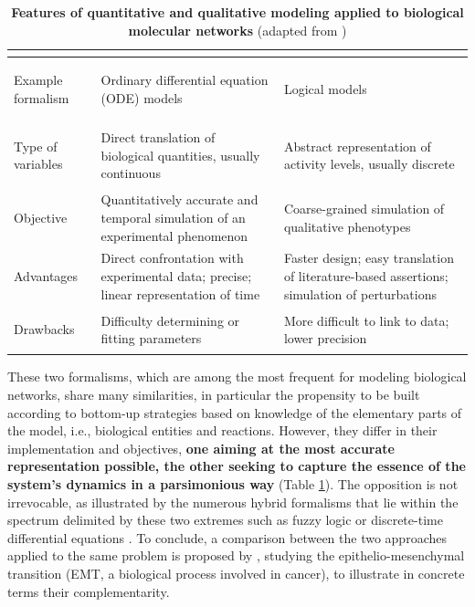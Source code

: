 \documentclass[a4paper,12pt,twoside,onecolumn,openright,final,oldfontcommands]{memoir}
\begin{document}
\begin{table}

\caption{\label{tab:odelogic}\textbf{Features of quantitative and qualitative
modeling applied to biological molecular networks} (adapted from
\citet{le2015quantitative})}
\centering
\begin{tabular}[t]{>{\bfseries\raggedright\arraybackslash}p{6em}||>{\raggedright\arraybackslash}p{12em}|>{\raggedright\arraybackslash}p{12em}}
\hline
\rowcolor[HTML]{808080}  \multicolumn{1}{c}{\textcolor{white}{\textbf{ }}} & \multicolumn{1}{c}{\textcolor{white}{\textbf{Quantitative modeling}}} & \multicolumn{1}{c}{\textcolor{white}{\textbf{Qualitative modeling}}}\\
\hline
Example formalism & Ordinary differential equation (ODE) models & Logical models\\
\hline
Type of variables & Direct translation of biological quantities, usually continuous & Abstract representation of activity levels, usually discrete\\
\hline
Objective & Quantitatively accurate and temporal simulation of an experimental phenomenon & Coarse-grained simulation of qualitative phenotypes\\
\hline
Advantages & Direct confrontation with experimental data; precise; linear representation of time & Faster design; easy translation of literature-based assertions; simulation of perturbations\\
\hline
Drawbacks & Difficulty determining or fitting parameters & More difficult to link to data; lower precision\\
\hline
\end{tabular}
\end{table}





These two formalisms, which are among the most frequent for modeling
biological networks, share many similarities, in particular the
propensity to be built according to bottom-up strategies based on
knowledge of the elementary parts of the model, i.e., biological
entities and reactions. However, they differ in their implementation and
objectives, \textbf{one aiming at the most accurate representation
possible, the other seeking to capture the essence of the system's
dynamics in a parsimonious way} (Table \ref{tab:odelogic}). The
opposition is not irrevocable, as illustrated by the numerous hybrid
formalisms that lie within the spectrum delimited by these two extremes
such as fuzzy logic or discrete-time differential equations
\citep{aldridge2009fuzzy, le2015quantitative, calzone2018logical}. To
conclude, a comparison between the two approaches applied to the same
problem is proposed by \citet{calzone2018logical}, studying the
epithelio-mesenchymal transition (EMT, a biological process involved in
cancer), to illustrate in concrete terms their complementarity.
\end{document}
